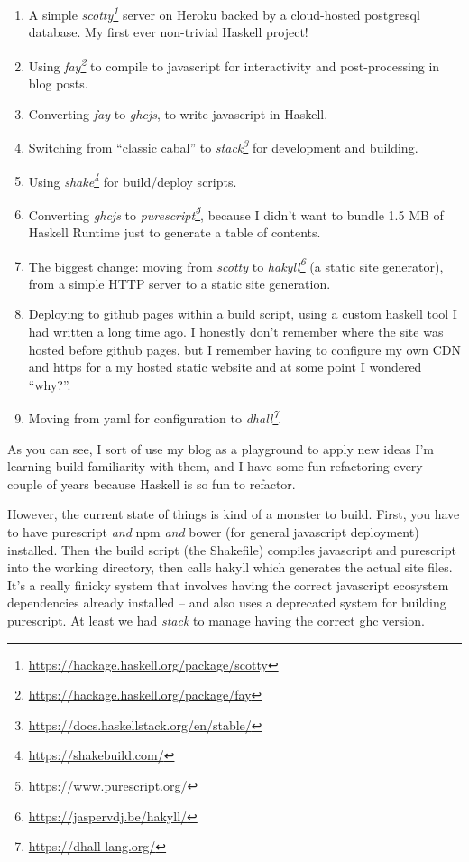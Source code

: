 \documentclass[]{article}
\renewcommand{\href}[2]{#2\footnote{\url{#1}}}
\begin{document}
\begin{enumerate}
\def\labelenumi{\arabic{enumi}.}
\tightlist
\item
  A simple \emph{\href{https://hackage.haskell.org/package/scotty}{scotty}}
  server on Heroku backed by a cloud-hosted postgresql database. My first ever
  non-trivial Haskell project!
\item
  Using \emph{\href{https://hackage.haskell.org/package/fay}{fay}} to compile to
  javascript for interactivity and post-processing in blog posts.
\item
  Converting \emph{fay} to \emph{ghcjs}, to write javascript in Haskell.
\item
  Switching from ``classic cabal'' to
  \emph{\href{https://docs.haskellstack.org/en/stable/}{stack}} for development
  and building.
\item
  Using \emph{\href{https://shakebuild.com/}{shake}} for build/deploy scripts.
\item
  Converting \emph{ghcjs} to
  \emph{\href{https://www.purescript.org/}{purescript}}, because I didn't want
  to bundle 1.5 MB of Haskell Runtime just to generate a table of contents.
\item
  The biggest change: moving from \emph{scotty} to
  \emph{\href{https://jaspervdj.be/hakyll/}{hakyll}} (a static site generator),
  from a simple HTTP server to a static site generation.
\item
  Deploying to github pages within a build script, using a custom haskell tool I
  had written a long time ago. I honestly don't remember where the site was
  hosted before github pages, but I remember having to configure my own CDN and
  https for a my hosted static website and at some point I wondered ``why?''.
\item
  Moving from yaml for configuration to
  \emph{\href{https://dhall-lang.org/}{dhall}}.
\end{enumerate}

As you can see, I sort of use my blog as a playground to apply new ideas I'm
learning build familiarity with them, and I have some fun refactoring every
couple of years because Haskell is so fun to refactor.

However, the current state of things is kind of a monster to build. First, you
have to have purescript \emph{and} npm \emph{and} bower (for general javascript
deployment) installed. Then the build script (the Shakefile) compiles javascript
and purescript into the working directory, then calls hakyll which generates the
actual site files. It's a really finicky system that involves having the correct
javascript ecosystem dependencies already installed -- and also uses a
deprecated system for building purescript. At least we had \emph{stack} to
manage having the correct ghc version.
\end{document}
